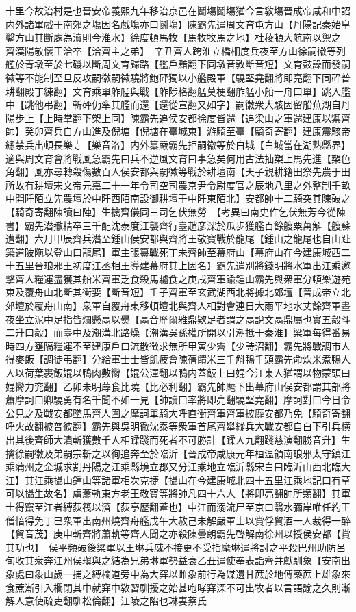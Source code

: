十里今故治村是也晉安帝義熙九年移治京邑在鬭塲鬬塲猶今言敎塲晉成帝咸和中詔内外諸軍戲于南郊之塲因名戲塲亦曰鬬塲】陳霸先遣周文育屯方山【丹陽記秦始皇鑿方山其斷處為瀆則今淮水】徐度頓馬牧【馬牧牧馬之地】杜稜頓大航南以禦之　齊漢陽敬懷王洽卒【洽齊主之弟】　辛丑齊人跨淮立橋柵度兵夜至方山徐嗣徽等列艦於青墩至於七磯以斷周文育歸路【艦戶黯翻下同墩音敦斷音短】文育鼓譟而發嗣徽等不能制至旦反攻嗣徽嗣徽驍將鮑砰獨以小艦殿軍【驍堅堯翻將即亮翻下同砰普耕翻殿丁練翻】文育乘單舴艋與戰【舴陟格翻艋莫梗翻舴艋小船一舟曰單】跳入艦中【跳他弔翻】斬砰仍牽其艦而還【還從宣翻又如字】嗣徽衆大駭因留船蕪湖自丹陽步上【上時掌翻下槊上同】陳霸先追侯安都徐度皆還【追梁山之軍還建康以禦齊師】癸卯齊兵自方山進及倪塘【倪塘在臺城東】游騎至臺【騎奇寄翻】建康震駭帝總禁兵出頓長樂寺【樂音洛】内外纂嚴霸先拒嗣徽等於白城【白城當在湖熟縣界】適與周文育會將戰風急霸先曰兵不逆風文育曰事急矣何用古法抽槊上馬先進【槊色角翻】風亦尋轉殺傷數百人侯安都與嗣徽等戰於耕壇南【天子親耕籍田祭先農于田所故有耕壇宋文帝元嘉二十一年令司空司農京尹令尉度官之辰地八里之外整制千畝中開阡陌立先農壇於中阡西陌南設御耕壇于中阡東陌北】安都帥十二騎突其陳破之【騎奇寄翻陳讀曰陣】生擒齊儀同三司乞伏無勞　【考異曰南史作乞伏無芳今從陳書】霸先潜撤精卒三千配沈泰度江襲齊行臺趙彦深於瓜步獲艦百餘艘粟萬斛【艘蘇遭翻】六月甲辰齊兵潛至鍾山侯安都與齊將王敬寶戰於龍尾【鍾山之龍尾也自山趾築道陂陁以登山曰龍尾】軍主張纂戰死丁未齊師至幕府山【幕府山在今建康城西二十五里晉琅邪王初度江丞相王導建幕府其上因名】霸先遣别將錢明將水軍出江乘邀擊齊人糧運盡獲其船米齊軍乏食殺馬驢食之庚戌齊軍踰鍾山霸先與衆軍分頓樂遊苑東及覆舟山北斷其衝要【斷音短】壬子齊軍至玄武湖西北將據北郊壇【晉成帝立北郊壇於覆舟山南】衆軍自覆舟東移頓壇北與齊人相對會連日大雨平地水丈餘齊軍晝夜坐立泥中足指皆爛懸鬲以㸑【鬲音歷爾雅鼎欵足者謂之鬲說文鬲鼎屬也實五觳斗二升曰觳】而臺中及潮溝北路燥【潮溝吳孫權所開以引潮抵于秦淮】梁軍每得番易時四方壅隔糧運不至建康戶口流散徵求無所甲寅少霽【少詩沼翻】霸先將戰調市人得麥飯【調徒弔翻】分給軍士士皆飢疲會陳蒨饋米三千斛鴨千頭霸先命炊米煮鴨人人以荷葉裹飯婫以鴨肉數臠【婫公渾翻以鴨内蓋飯上曰婫今江東人猶謂以物蒙頭曰婫臠力兖翻】乙卯未明蓐食比曉【比必利翻】霸先帥麾下出幕府山侯安都謂其部將蕭摩訶曰卿驍勇有名千聞不如一見【帥讀曰率將即亮翻驍堅堯翻】摩訶對曰今日令公見之及戰安都墜馬齊人圍之摩訶單騎大呼直衝齊軍齊軍披靡安都乃免【騎奇寄翻呼火故翻披普彼翻】霸先與吳明徹沈泰等衆軍首尾齊舉縱兵大戰安都自白下引兵横出其後齊師大潰斬獲數千人相蹂踐而死者不可勝計【蹂人九翻踐慈演翻勝音升】生擒徐嗣徽及弟嗣宗斬之以徇追奔至於臨沂【晉成帝咸康元年桓温領南琅邪太守鎮江乘蒲州之金城求割丹陽之江乘縣境立郡又分江乘地立臨沂縣宋白曰臨沂山西北臨大江】其江乘攝山鍾山等諸軍相次克捷【攝山在今建康城北四十五里江乘地記曰有草可以攝生故名】虜蕭軌東方老王敬寶等將帥凡四十六人【將即亮翻帥所類翻】其軍士得竄至江者縛荻筏以濟【荻亭歷翻葦也】中江而溺流尸至京口翳水彌岸唯任約王僧愔得免丁巳衆軍出南州燒齊舟艦戊午大赦己未解嚴軍士以賞俘貿酒一人裁得一醉【貿音茂】庚申斬齊將蕭軌等齊人聞之亦殺陳曇朗霸先啓解南徐州以授侯安都【賞其功也】　侯平頻破後梁軍以王琳兵威不接更不受指麾琳遣將討之平殺巴州助防呂旬收其衆奔江州侯瑱與之結為兄弟琳軍勢益衰乙丑遣使奉表詣齊并獻馴象【安南出象處曰象山歲一捕之縛欄道旁中為大穽以雌象前行為媒遺甘蔗於地傅藥蔗上雄象來食蔗漸引入欄閉其中就穽中敎習馴擾之始甚咆哮穽深不可出牧者以言語諭之久則漸解人意使疏吏翻馴松倫翻】江陵之陷也琳妻蔡氏